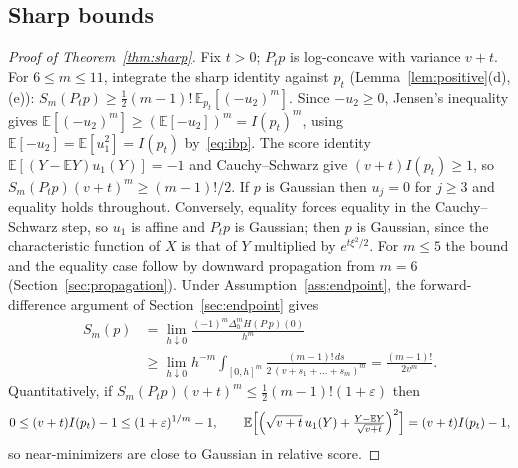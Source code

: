 \documentclass[11pt]{article}
\theoremstyle{definition}
\theoremstyle{remark}
\newcommand{\E}{\mathbb E}
\begin{document}
\subsection{Sharp bounds}\label{sec:sharp-proof}
\begin{proof}[Proof of Theorem~\ref{thm:sharp}]
Fix $t>0$; $P_tp$ is log-concave with variance $v+t$. For $6\le m\le11$, integrate the
sharp identity against $p_t$ (Lemma~\ref{lem:positive}(d),(e)):
$S_m(P_tp)\ge\tfrac12(m-1)!\,\E_{p_t}[(-u_2)^m]$. Since $-u_2\ge0$, Jensen's inequality
gives $\E[(-u_2)^m]\ge(\E[-u_2])^m=I(p_t)^m$, using $\E[-u_2]=\E[u_1^2]=I(p_t)$
by~\eqref{eq:ibp}. The score identity $\E[(Y-\E Y)u_1(Y)]=-1$ and Cauchy--Schwarz give
$(v+t)I(p_t)\ge1$, so $S_m(P_tp)(v+t)^m\ge(m-1)!/2$. If $p$ is Gaussian then $u_j=0$
for $j\ge3$ and equality holds throughout. Conversely, equality forces equality in the
Cauchy--Schwarz step, so $u_1$ is affine and $P_tp$ is Gaussian; then $p$ is Gaussian,
since the characteristic function of $X$ is that of $Y$ multiplied by
$e^{t\xi^2/2}$. For $m\le5$ the bound and the equality case follow by downward
propagation from $m=6$ (Section~\ref{sec:propagation}). Under
Assumption~\ref{ass:endpoint}, the forward-difference argument of
Section~\ref{sec:endpoint} gives
\begin{align*}
 S_m(p)&=\lim_{h\downarrow0}\frac{(-1)^m\Delta_h^mH(P_\cdot p)(0)}{h^m}\\
 &\ge\lim_{h\downarrow0}h^{-m}\!\int_{[0,h]^m}\frac{(m-1)!\,ds}{2\,(v+s_1+\dots+s_m)^m}
 =\frac{(m-1)!}{2v^m}.
\end{align*}
Quantitatively, if $S_m(P_tp)(v+t)^m\le\tfrac12(m-1)!(1+\varepsilon)$ then
\[
 0\le(v+t)I(p_t)-1\le(1+\varepsilon)^{1/m}-1,\qquad
 \E\Bigl[\Bigl(\sqrt{v+t}\,u_1(Y)+\tfrac{Y-\E Y}{\sqrt{v+t}}\Bigr)^2\Bigr]=(v+t)I(p_t)-1,
\]
so near-minimizers are close to Gaussian in relative score.
\end{proof}
\end{document}
